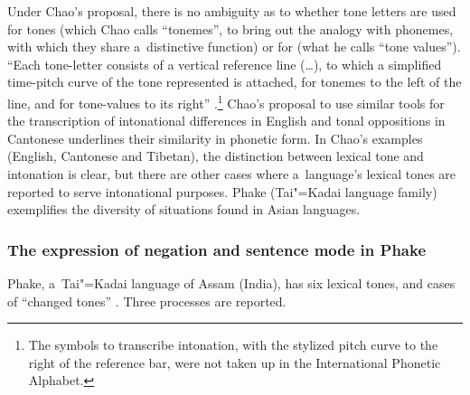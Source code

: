 
Under Chao's proposal, there is no ambiguity as to whether tone letters are used for tones (which Chao calls “tonemes”, to bring out the {analogy} with {\linebreak}phonemes, with which they share a~distinctive function) or for  (what he calls “tone values”). “Each tone-letter consists of a vertical reference line ({\dots}), to which a simplified time-pitch curve of the tone represented is attached, for tonemes to the left of the line, and for tone-values to its right” \citep[24-25]{chao1930}.\footnote{The symbols to transcribe {intonation}, with the stylized pitch curve to the right of the reference bar, were not taken up in the International Phonetic Alphabet.} Chao's proposal to use similar tools for the transcription of intonational differences in {English} and tonal oppositions in Cantonese underlines their similarity in phonetic form. In Chao's examples ({English}, Cantonese and {Tibetan}), the distinction between lexical tone and {intonation} is clear, but there are other cases where a~language’s lexical tones are reported to serve intonational purposes. Phake (Tai"=Kadai
language family) exemplifies the diversity of situations found in Asian languages.

\subsubsection{The expression of negation and sentence mode in Phake}

Phake, a~Tai"=Kadai language of Assam (India), has six lexical tones, and cases of “changed tones”
\citep[234–240]{morey2008}. Three processes are reported. 

